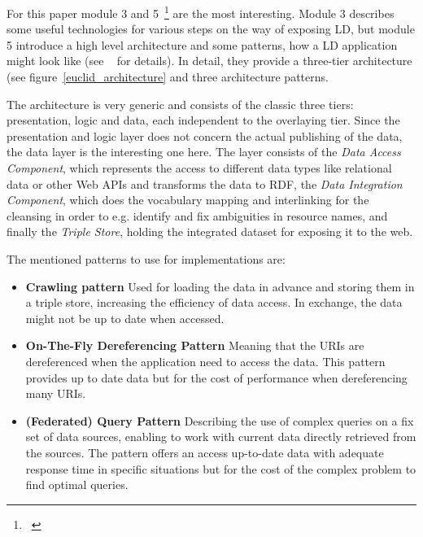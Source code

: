 For this paper module 3 and 5~\footnote{~\cite{euclid:chap5}} are the most interesting. Module 3 describes some useful technologies for various steps on the way of exposing LD, but module 5 introduce a high level architecture and some patterns, how a LD application might look like (see ~\cite{euclid:chap5} for details). In detail, they provide a three-tier architecture (see figure~\ref{euclid_architecture} and three architecture patterns.

The architecture is very generic and consists of the classic three tiers: presentation, logic and data, each independent to the overlaying tier. Since the presentation and logic layer does not concern the actual publishing of the data, the data layer is the interesting one here. The layer consists of the \emph{Data Access Component}, which represents the access to different data types like relational data or other Web APIs and transforms the data to RDF, the \emph{Data Integration Component}, which does the vocabulary mapping and interlinking for the cleansing in order to e.g. identify and fix ambiguities in resource names, and finally the \emph{Triple Store}, holding the integrated dataset for exposing it to the web.

The mentioned patterns to use for implementations are:

\begin{itemize}

\item \textbf{Crawling pattern}
Used for loading the data in advance and storing them in a triple store, increasing the efficiency of data access. In exchange, the data might not be up to date when accessed.

\item \textbf{On-The-Fly Dereferencing Pattern}
Meaning that the URIs are dereferenced when the application need to access the data. This pattern provides up to date data but for the cost of performance when dereferencing many URIs.

\item \textbf{(Federated) Query Pattern}
Describing the use of complex queries on a fix set of data sources, enabling to work with current data directly retrieved from the sources. The pattern offers an access up-to-date data with adequate response time in specific situations but for the cost of the complex problem to find optimal queries.
\end{itemize}

